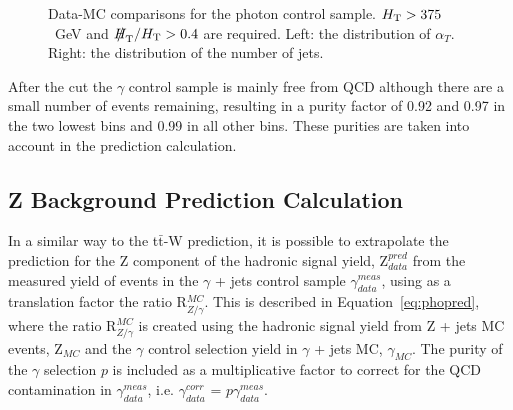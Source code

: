 \begin{figure}[h]
\begin{center}
\caption{\label{fig:photon_plots} Data-MC comparisons for the photon control sample. $\mbox{$H_\text{T}$} > 375$~GeV and $\mht/\scalht>0.4$ are required. Left: the distribution of $\alpha_{T}$. Right: the distribution of the number of jets.}
\end{center}
\end{figure}

After the \alt cut the $\gamma$ control sample is mainly free from QCD although there are a small number of events remaining, resulting in a purity factor of 0.92 and 0.97 in the two lowest bins and 0.99 in all other bins. These purities are taken into account in the prediction calculation.

\subsection{Z Background Prediction Calculation}

In a similar way to the t$\bar{\textrm{t}}$-W prediction, it is possible to extrapolate the prediction for the Z component of the hadronic signal yield, Z$^{pred}_{data}$ from the measured yield of events in the $\gamma$ + jets control sample $\gamma^{meas}_{data}$, using as a translation factor the ratio R$^{MC}_{Z/\gamma}$. This is described in Equation~\ref{eq:phopred}, where the ratio R$^{MC}_{Z/\gamma}$ is created using the hadronic signal yield from Z + jets MC events, Z$_{MC}$ and the $\gamma$ control selection yield in $\gamma$ + jets MC, $\gamma_{MC}$. The purity of the $\gamma$ selection $p$ is included as a multiplicative factor to correct for the QCD contamination in $\gamma^{meas}_{data}$, i.e. $\gamma^{corr}_{data}$ = $p \gamma^{meas}_{data}$.

